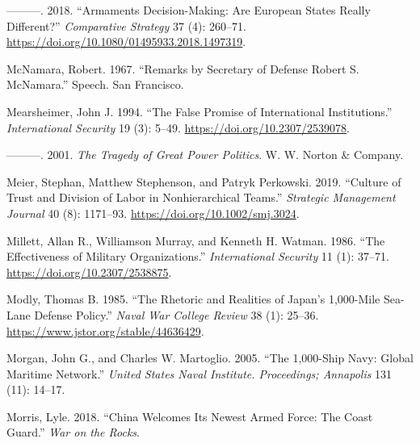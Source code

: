 \documentclass[
  12,
  letterpaper,
  DIV=11,
  numbers=noendperiod]{scrartcl}
\newlength{\cslhangindent}
\newlength{\cslentryspacingunit} %
\newenvironment{CSLReferences}[2] %
 {%
  \setlength{\parindent}{0pt}
  \ifodd #1
  \let\oldpar\par
  \def\par{\hangindent=\cslhangindent\oldpar}
  \fi
  \setlength{\parskip}{#2\cslentryspacingunit}
 }%
 {}
\begin{document}
\begin{CSLReferences}{1}{0}
\leavevmode{}%
---------. 2018. {``Armaments Decision-Making: {Are European} States
Really Different?''} \emph{Comparative Strategy} 37 (4): 260--71.
\url{https://doi.org/10.1080/01495933.2018.1497319}.

\leavevmode{}%
McNamara, Robert. 1967. {``Remarks by {Secretary} of {Defense Robert S}.
{McNamara}.''} Speech. {San Francisco}.

\leavevmode{}%
Mearsheimer, John J. 1994. {``The {False Promise} of {International
Institutions}.''} \emph{International Security} 19 (3): 5--49.
\url{https://doi.org/10.2307/2539078}.

\leavevmode{}%
---------. 2001. \emph{The {Tragedy} of {Great Power Politics}}. {W. W.
Norton \& Company}.

\leavevmode{}%
Meier, Stephan, Matthew Stephenson, and Patryk Perkowski. 2019.
{``Culture of Trust and Division of Labor in Nonhierarchical Teams.''}
\emph{Strategic Management Journal} 40 (8): 1171--93.
\url{https://doi.org/10.1002/smj.3024}.

\leavevmode{}%
Millett, Allan R., Williamson Murray, and Kenneth H. Watman. 1986.
{``The {Effectiveness} of {Military Organizations}.''}
\emph{International Security} 11 (1): 37--71.
\url{https://doi.org/10.2307/2538875}.

\leavevmode{}%
Modly, Thomas B. 1985. {``The {Rhetoric} and {Realities} of {Japan}'s
1,000-{Mile Sea-Lane Defense Policy}.''} \emph{Naval War College Review}
38 (1): 25--36. \url{https://www.jstor.org/stable/44636429}.

\leavevmode{}%
Morgan, John G., and Charles W. Martoglio. 2005. {``The 1,000-{Ship
Navy}: {Global Maritime Network}.''} \emph{United States Naval
Institute. Proceedings; Annapolis} 131 (11): 14--17.

\leavevmode{}%
Morris, Lyle. 2018. {``China {Welcomes Its Newest Armed Force}: {The
Coast Guard}.''} \emph{War on the Rocks}.


\end{CSLReferences}
\end{document}
